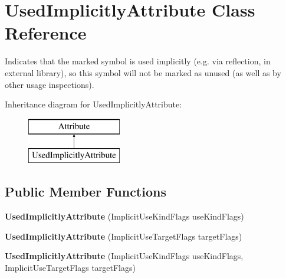 \hypertarget{class_used_implicitly_attribute}{}\section{Used\+Implicitly\+Attribute Class Reference}
\label{class_used_implicitly_attribute}


Indicates that the marked symbol is used implicitly (e.\+g. via reflection, in external library), so this symbol will not be marked as unused (as well as by other usage inspections).  


Inheritance diagram for Used\+Implicitly\+Attribute\+:\begin{figure}[H]
\begin{center}
\leavevmode
\includegraphics[height=2.000000cm]{class_used_implicitly_attribute}
\end{center}
\end{figure}
\subsection*{Public Member Functions}
\begin{DoxyCompactItemize}
\item 
\hypertarget{class_used_implicitly_attribute_ae2dc37889a97f27f89c986e0e46ad81f}{}{\bfseries Used\+Implicitly\+Attribute} (Implicit\+Use\+Kind\+Flags use\+Kind\+Flags)\label{class_used_implicitly_attribute_ae2dc37889a97f27f89c986e0e46ad81f}

\item 
\hypertarget{class_used_implicitly_attribute_ae1b2c052663335aa4bf2e3ff2510e821}{}{\bfseries Used\+Implicitly\+Attribute} (Implicit\+Use\+Target\+Flags target\+Flags)\label{class_used_implicitly_attribute_ae1b2c052663335aa4bf2e3ff2510e821}

\item 
\hypertarget{class_used_implicitly_attribute_ad9247e3d6829ade0057de0bb0c7e3cbf}{}{\bfseries Used\+Implicitly\+Attribute} (Implicit\+Use\+Kind\+Flags use\+Kind\+Flags, Implicit\+Use\+Target\+Flags target\+Flags)\label{class_used_implicitly_attribute_ad9247e3d6829ade0057de0bb0c7e3cbf}

\end{DoxyCompactItemize}
